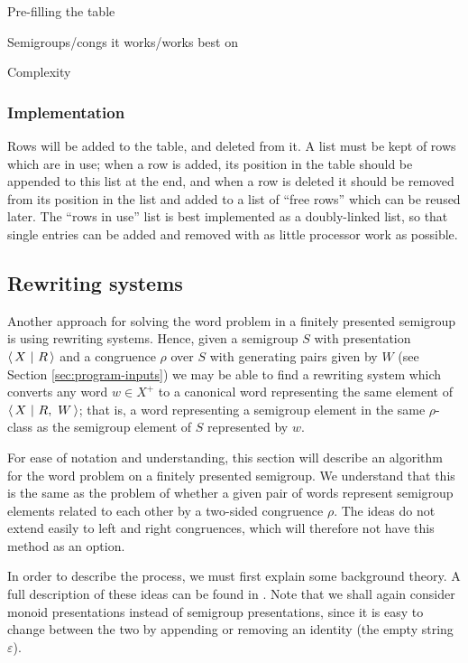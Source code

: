 Pre-filling the table

Semigroups/congs it works/works best on

Complexity

\subsubsection{Implementation}

Rows will be added to the table, and deleted from it.  A list must be kept of
rows which are in use; when a row is added, its position in the table should be
appended to this list at the end, and when a row is deleted it should be removed
from its position in the list and added to a list of ``free rows'' which can be
reused later.  The ``rows in use'' list is best implemented as a doubly-linked
list, so that single entries can be added and removed with as little processor
work as possible.

\clearpage

\subsection{Rewriting systems}
\label{sec:kb}

Another approach for solving the word problem in a finitely presented semigroup
is using rewriting systems.  Hence, given a semigroup $S$ with presentation
$\left\langle\,X ~\middle|~ R\,\right\rangle$ and a congruence $\rho$ over $S$ with generating pairs given by $W$
(see Section \ref{sec:program-inputs})
we may be able to find a rewriting system which converts any word $w \in X^+$ to
a canonical word representing the same element of $\left\langle\,X ~\middle|~ R,\ W\,\right\rangle$;
that is, a word representing a semigroup element in the same $\rho$-class as
the semigroup element of $S$ represented by $w$.

For ease of notation and understanding, this section will describe an algorithm
for the word problem on a finitely presented semigroup.  We understand that this
is the same as the problem of whether a given pair of words represent semigroup
elements related to each other by a two-sided congruence $\rho$.  The ideas do
not extend easily to left and right congruences, which will therefore not have
this method as an option.

In order
to describe the process, we must first explain some background theory.  A full
description of these ideas can be found in \cite[Section 12.2]{cgt}.  Note that
we shall again consider monoid presentations instead of semigroup presentations,
since it is easy to change between the two by appending or removing an identity
(the empty string $\varepsilon$).

